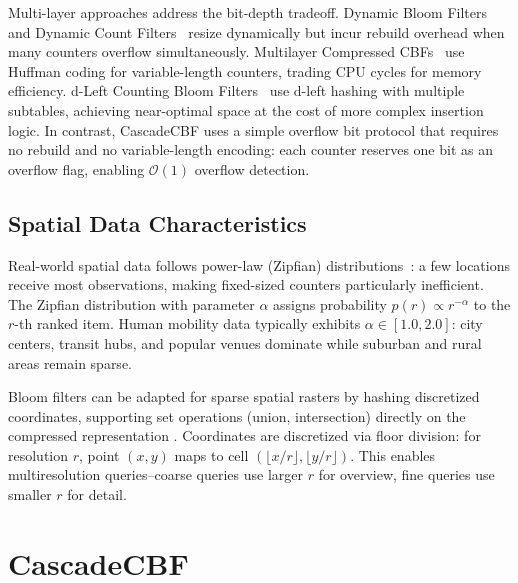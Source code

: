 \documentclass[agile, final]{copernicus-agile}
\begin{document}
Multi-layer approaches address the bit-depth tradeoff. Dynamic Bloom Filters~\citep{guo2009dynamic} and Dynamic Count Filters~\citep{aguilar-saborit_dynamic_2006} resize dynamically but incur rebuild overhead when many counters overflow simultaneously. Multilayer Compressed CBFs~\citep{ficara_multilayer_2008} use Huffman coding for variable-length counters, trading CPU cycles for memory efficiency. d-Left Counting Bloom Filters~\citep{bonomi2006improved} use d-left hashing with multiple subtables, achieving near-optimal space at the cost of more complex insertion logic. In contrast, CascadeCBF uses a simple overflow bit protocol that requires no rebuild and no variable-length encoding: each counter reserves one bit as an overflow flag, enabling $\mathcal{O}(1)$ overflow detection.

\subsection{Spatial Data Characteristics}

Real-world spatial data follows power-law (Zipfian) distributions~\citep{broder2004network}: a few locations receive most observations, making fixed-sized counters particularly inefficient. The Zipfian distribution with parameter $\alpha$ assigns probability $p(r) \propto r^{-\alpha}$ to the $r$-th ranked item. Human mobility data typically exhibits $\alpha \in [1.0, 2.0]$: city centers, transit hubs, and popular venues dominate while suburban and rural areas remain sparse.

Bloom filters can be adapted for sparse spatial rasters by hashing discretized coordinates, supporting set operations (union, intersection) directly on the compressed representation \citep{werner2019globimaps}. Coordinates are discretized via floor division: for resolution $r$, point $(x, y)$ maps to cell $(\lfloor x/r \rfloor, \lfloor y/r \rfloor)$. This enables multiresolution queries--coarse queries use larger $r$ for overview, fine queries use smaller $r$ for detail.


\section{CascadeCBF}
\label{sec:cgm}
\end{document}
